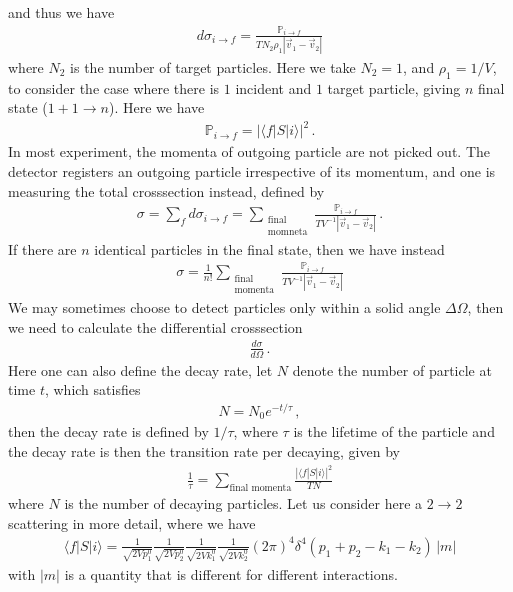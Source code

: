 \documentclass[11pt, onesided]{book}
\theoremstyle{break}
\theoremstyle{break}
\begin{document}
and thus we have
\begin{align*}
d\sigma_{i\to f} = \frac{\mathbb{P}_{i\to f}}{T N_2 \rho_1 |\vec{v}_1 - \vec{v}_2|}
\end{align*}
where $N_2$ is the number of target particles. Here we take $N_2 = 1$, and $\rho_1 = 1/V$, to consider the case where there is $1$ incident and $1$ target particle, giving $n$ final state ($1 + 1 \to n$). Here we have
\begin{align*}
\mathbb{P}_{i\to f} = |\langle f|S | i\rangle|^2\,.
\end{align*}
In most experiment, the momenta of outgoing particle are not picked out. The detector registers an outgoing particle irrespective of its momentum, and one is measuring the total crosssection instead, defined by
\begin{align*}
\sigma = \sum_{f} d\sigma_{i\to f} = \sum_{\substack{\text{final}\\ \text{momneta}}} \frac{\mathbb{P}_{i\to f}}{TV^{-1}|\vec{v}_1 - \vec{v}_2|}\,.
\end{align*}
If there are $n$ identical particles in the final state, then we have instead
\begin{align*}
\sigma = \frac{1}{n!}\sum_{\substack{\text{final}\\\text{momenta}}}\frac{\mathbb{P}_{i\to f}}{TV^{-1}|\vec{v}_1 - \vec{v}_2|}
\end{align*}
We may sometimes choose to detect particles only within a solid angle $\Delta \Omega$, then we need to calculate the differential crosssection
\begin{align*}
\frac{d\sigma}{d\Omega}\,.
\end{align*}
Here one can also define the decay rate, let $N$ denote the number of particle at time $t$, which satisfies
\begin{align*}
N = N_0 e^{-t/\tau}\,,
\end{align*}
then the decay rate is defined by $1/\tau$, where $\tau$ is the lifetime of the particle and the decay rate is then the transition rate per decaying, given by
\begin{align*}
\frac{1}{\tau} = \sum_{\text{final momenta}} \frac{|\langle f|S|i\rangle|^2}{TN}
\end{align*}
where $N$ is the number of decaying particles. Let us consider here a $2\to 2$ scattering in more detail, where we have
\begin{align*}
 \langle f | S | i\rangle = \frac{1}{\sqrt{2Vp_1^0}}\frac{1}{\sqrt{2Vp_2^0}}\frac{1}{\sqrt{2Vk_1^0}}\frac{1}{\sqrt{2Vk_2^0}} (2\pi)^4 \delta^4(p_1 + p_2-k_1 -k_2)\,|m| 
\end{align*}
with $|m|$ is a quantity that is different for different interactions.\\
\end{document}
